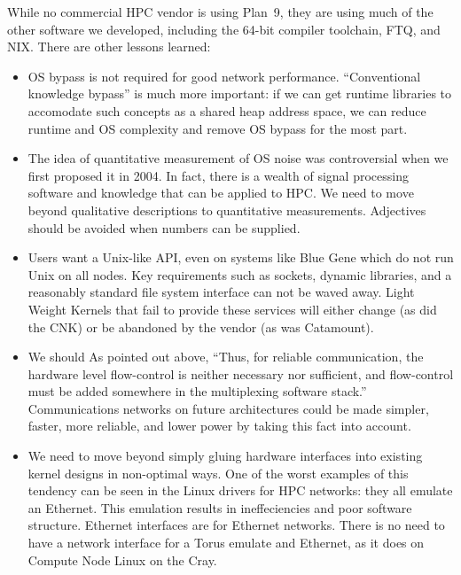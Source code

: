 \documentclass{report}
\begin{document}
While no commercial HPC vendor is using Plan~9, they are using much of the other software we developed, 
including the 64-bit compiler toolchain, FTQ, and NIX. 
There are other lessons learned: 
\begin{itemize}
\item OS bypass is not required for good network performance. ``Conventional knowledge
bypass'' is much more important: if we can get runtime libraries to accomodate 
such concepts as a shared heap address space, we can reduce runtime and OS 
complexity and remove OS bypass for the most part. 
\item The idea of quantitative measurement of OS noise was controversial when we first proposed it in 2004. 
In fact, there is a wealth of signal processing software and knowledge that can be applied to HPC. We need
to move beyond qualitative descriptions to quantitative measurements. Adjectives should be avoided
when numbers can be supplied. 
\item Users want a Unix-like API, even on systems like Blue Gene which do not run Unix on all nodes. 
Key requirements such as sockets, dynamic libraries, and a reasonably standard file system
interface can not be waved away. Light Weight Kernels that fail to provide these services
will either change (as did the CNK) or be abandoned by the vendor (as was Catamount). 
\item We should As pointed out above, ``Thus, for reliable communication, the hardware level flow-control is neither necessary nor sufficient, 
and flow-control must be added somewhere in the multiplexing software stack.'' Communications networks
on future architectures could be made simpler, faster, more reliable, and lower power by taking 
this fact into account. 
\item We need to move beyond simply gluing hardware interfaces into existing kernel designs in non-optimal ways. 
One of the worst examples of this tendency can be seen in the Linux drivers for HPC networks: they all emulate an Ethernet. 
This emulation results in ineffeciencies and poor software structure. Ethernet interfaces are for Ethernet networks. There is no need to have a network interface for a
Torus emulate and Ethernet, as it does on Compute Node Linux on the Cray. 
\end{itemize}
\end{document}
